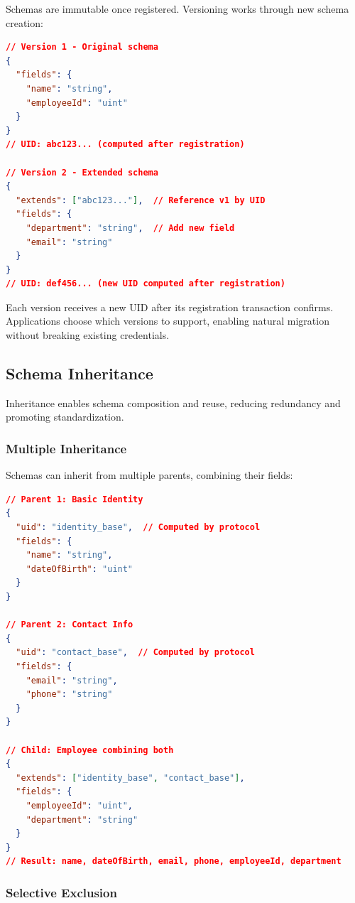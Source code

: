 \documentclass[11pt,a4paper]{article}
\begin{document}
Schemas are immutable once registered. Versioning works through new schema creation:

\begin{lstlisting}[language=json,caption={Schema Evolution}]
// Version 1 - Original schema
{
  "fields": {
    "name": "string",
    "employeeId": "uint"
  }
}
// UID: abc123... (computed after registration)

// Version 2 - Extended schema
{
  "extends": ["abc123..."],  // Reference v1 by UID
  "fields": {
    "department": "string",  // Add new field
    "email": "string"
  }
}
// UID: def456... (new UID computed after registration)
\end{lstlisting}

Each version receives a new UID after its registration transaction confirms. Applications choose which versions to support, enabling natural migration without breaking existing credentials.

\subsection{Schema Inheritance}

Inheritance enables schema composition and reuse, reducing redundancy and promoting standardization.

\subsubsection{Multiple Inheritance}

Schemas can inherit from multiple parents, combining their fields:

\begin{lstlisting}[language=json,caption={Multiple Inheritance Example}]
// Parent 1: Basic Identity
{
  "uid": "identity_base",  // Computed by protocol
  "fields": {
    "name": "string",
    "dateOfBirth": "uint"
  }
}

// Parent 2: Contact Info
{
  "uid": "contact_base",  // Computed by protocol
  "fields": {
    "email": "string",
    "phone": "string"
  }
}

// Child: Employee combining both
{
  "extends": ["identity_base", "contact_base"],
  "fields": {
    "employeeId": "uint",
    "department": "string"
  }
}
// Result: name, dateOfBirth, email, phone, employeeId, department
\end{lstlisting}

\subsubsection{Selective Exclusion}
\end{document}

